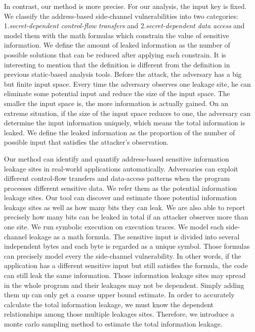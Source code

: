 In contrast, our method is more precise. 
For our analysis, the input key is fixed. We classify the address-based side-channel 
vulnerabilities into two categories: 1.\textit{secret-dependent control-flow transfers} 
and 2.\textit{secret-dependent data access} and model them with the math formulas which
constrain the value of sensitive information.
We define the amount of leaked information as the number of possible solutions that can be
reduced after applying each constrain.
It is interesting to mention that the definition is different from the 
definition in previous static-based analysis tools. 
Before the attack, the adversary has a big but finite input space.
Every time the adversary observes one leakage site, he can eliminate some potential input and
reduce the size of the input space. The smaller the input space is, the more information is 
actually gained. On an extreme situation, if the size of the input space reduces to one, the
adversary can determine the input information uniquely, which means the total information is 
leaked. We define the leaked information as the proportion of the number of possible input 
that satisfies the attacker's observation.

Our method can identify and quantify address-based
sensitive information leakage sites in real-world applications automatically. 
Adversaries can exploit different control-flow transfers and data-access patterns when 
the program processes different sensitive data. We refer them as the potential information
leakage sites. Our tool can discover and estimate those potential information leakage sites 
as well as how many bits they can leak. We are also able to report precisely how many bits
can be leaked in total if an attacker observes more than one site.
We run symbolic execution on execution traces. We model each side-channel leakage as a math formula. 
The sensitive input is divided into several independent bytes and each byte is regarded as 
a unique symbol. Those formulas can precisely model every the side-channel vulnerability. 
In other words, if the application has a different sensitive input but still satisfies the formula, 
the code can still leak the same information.  
Those information leakage sites may spread in the whole program 
and their leakages may not be dependent. Simply adding them up can only get a coarse upper bound 
estimate. In order to accurately calculate the total information leakage, we must know the 
dependent relationships among those multiple leakages sites. Therefore, we introduce a 
monte carlo sampling method to estimate the total information leakage.

